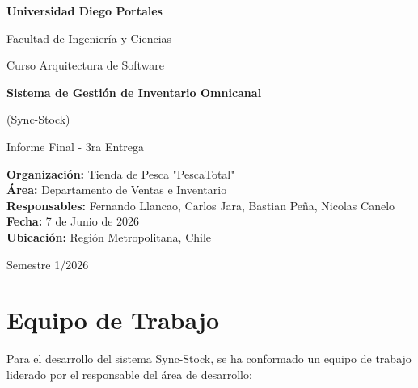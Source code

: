 \documentclass[12pt,a4paper]{article}
\begin{document}
\begin{titlepage}
    \centering
    {\bfseries\Large Universidad Diego Portales \par}
    {\large Facultad de Ingeniería y Ciencias \par}
    {\large Curso Arquitectura de Software \par}
    \vspace{3cm}
    {\bfseries\huge Sistema de Gestión de Inventario Omnicanal \par}
    {\huge (Sync-Stock) \par}
    \vspace{1.5cm}
    {\Large Informe Final - 3ra Entrega \par}
    \vspace{2cm}
    \begin{flushleft}
        {\bfseries Organización:} Tienda de Pesca "PescaTotal" \\
        {\bfseries Área:} Departamento de Ventas e Inventario \\
        {\bfseries Responsables:} Fernando Llancao, Carlos Jara, Bastian Peña, Nicolas Canelo \\
        {\bfseries Fecha:} 7 de Junio de 2026 \\
        {\bfseries Ubicación:} Región Metropolitana, Chile
    \end{flushleft}
    \vfill
    {\large Semestre 1/2026}
\end{titlepage}

\newpage
\tableofcontents
\newpage

\section{Equipo de Trabajo}
Para el desarrollo del sistema Sync-Stock, se ha conformado un equipo de trabajo liderado por el responsable del área de desarrollo:
\end{document}
